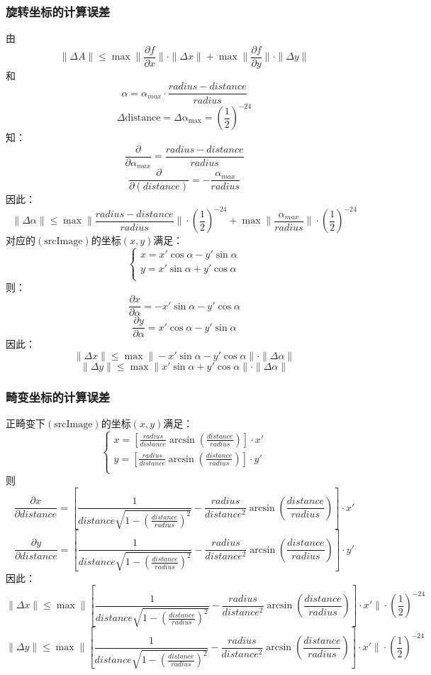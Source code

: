 \documentclass{article}
\begin{document}
\subsubsection{旋转坐标的计算误差}
\noindent 由
$$\| \Delta A\| \leqslant \max{\|\frac{\partial f}{\partial x}\|}\cdot \|\Delta x\| + \max{\|\frac{\partial f}{\partial y}\|}\cdot \|\Delta y\|$$
和
$$\alpha = \alpha_{max} \cdot \frac{radius-distance}{radius}$$
$$\Delta \mathrm{distance} = \Delta \mathrm{\alpha_{max}} = (\frac{1}{2})^{-24}$$
知：
$$\frac{\partial}{\partial \alpha_{max}} = \frac{radius - distance}{radius}$$
$$\frac{\partial}{\partial (distance)} = -\frac{\alpha_{max}}{radius}$$
因此：
$$\| \Delta \alpha\| \leqslant \max{\|\frac{radius - distance}{radius}\|}\cdot (\frac{1}{2})^{-24} + \max{\|\frac{\alpha_{max}}{radius}\|}\cdot (\frac{1}{2})^{-24}$$
对应的$\mathrm{(srcImage)}$的坐标$(x,y)$满足：
\begin{equation}
\left\{
	\begin{aligned}
		x = x'\cos{\alpha} - y'\sin{\alpha}\\
		y = x'\sin{\alpha} + y'\cos{\alpha}\\
	\end{aligned}
\right.
\end{equation}
则：
$$\frac{\partial x}{\partial \alpha} = -x'\sin{\alpha} - y'\cos{\alpha}$$
$$\frac{\partial y}{\partial \alpha} = x'\cos{\alpha} - y'\sin{\alpha}$$
因此：
$$\| \Delta x\| \leqslant \max{\|-x'\sin{\alpha} - y'\cos{\alpha}\|}\cdot \| \Delta \alpha\|$$
$$\| \Delta y\| \leqslant \max{\|x'\sin{\alpha} + y'\cos{\alpha}\|}\cdot \| \Delta \alpha\|$$

\subsubsection{畸变坐标的计算误差}
\noindent 正畸变下$\mathrm{(srcImage)}$的坐标$(x,y)$满足：
\begin{equation}
	\left\{
		\begin{aligned}
			x = [\frac{radius}{distance}\arcsin{(\frac{distance}{radius})}] \cdot x'\\
			y = [\frac{radius}{distance}\arcsin{(\frac{distance}{radius})}] \cdot y'\\
		\end{aligned}
	\right.
\end{equation}
则
$$\frac{\partial x}{\partial distance} = [\frac{1}{distance\sqrt{1-(\frac{distance}{radius})^2}} - \frac{radius}{distance^2}\arcsin{(\frac{distance}{radius})}] \cdot x'$$
$$\frac{\partial y}{\partial distance} = [\frac{1}{distance\sqrt{1-(\frac{distance}{radius})^2}} - \frac{radius}{distance^2}\arcsin{(\frac{distance}{radius})}] \cdot y'$$
因此：
$$\| \Delta x\| \leqslant \max{\|[\frac{1}{distance\sqrt{1-(\frac{distance}{radius})^2}} - \frac{radius}{distance^2}\arcsin{(\frac{distance}{radius})}] \cdot x'\|}\cdot (\frac{1}{2})^{-24}$$
$$\| \Delta y\| \leqslant \max{\|[\frac{1}{distance\sqrt{1-(\frac{distance}{radius})^2}} - \frac{radius}{distance^2}\arcsin{(\frac{distance}{radius})}] \cdot x'\|}\cdot (\frac{1}{2})^{-24}$$
\end{document}
